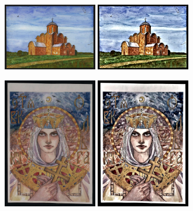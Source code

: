 \begin{figure}
     \centering
     \begin{subfigure}[b]{0.5\textwidth}
         \centering
         \includegraphics[width=0.45\textwidth]{images/style_augments/1998_14-17_0101_RUS_R_C.jpg}\hfil
         \includegraphics[width=0.45\textwidth]{images/style_augments/1998_14-17_0101_RUS_R_C_texture.jpg}
         \caption{}
     \end{subfigure}
     \hfil
     \begin{subfigure}[b]{0.5\textwidth}
         \centering
         \includegraphics[width=0.45\textwidth]{images/style_augments/2019_14-17_0193_RUS_R_C.jpg}\hfil
         \includegraphics[width=0.45\textwidth]{images/style_augments/2019_14-17_0193_RUS_R_C_texture.jpg}

\end{subfigure}
\end{figure}

